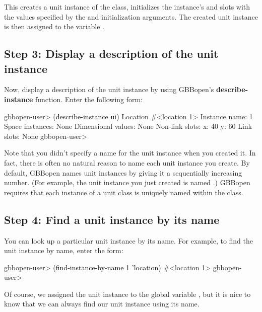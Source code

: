 \documentclass[10pt,twoside,english,pdftex]{article}
\begin{document}
This creates a unit instance of the  class, initializes the
instance's  and  slots with the values specified by the
 and  initialization arguments.  The created unit instance
is then assigned to the variable .

\subsection*{Step 3: Display a description of the unit instance}

%
%
Now, display a description of the unit instance by using GBBopen's
\textbf{describe-instance} function.  Enter the following form:
%
\W\supp
\begin{example}
\textcolor{darkergray}{%
  gbbopen-user> \textcolor{black}{(describe-instance ui)}
  Location #<location 1>
    Instance name: 1
    Space instances: None
    Dimensional values: None
    Non-link slots:
      x:  40
      y:  60
    Link slots: None
  gbbopen-user>}
\end{example}

Note that you didn't specify a name for the unit instance when you created it.
In fact, there is often no natural reason to name each unit instance you
create. By default, GBBopen names unit instances by giving it a sequentially
increasing number.  (For example, the unit instance you just created is named
.)  GBBopen requires that each instance of a unit class is uniquely
named within the class.

\subsection*{Step 4: Find a unit instance by its name}

%
%
You can look up a particular unit instance by its name. For example, to
find the   unit instance by name, enter the form:
%
\W\supp
\begin{example}
\textcolor{darkergray}{%
  gbbopen-user> \textcolor{black}{(find-instance-by-name 1 'location)}
  #<location 1>
  gbbopen-user>}
\end{example}

Of course, we assigned the  unit instance to the global
variable , but it is nice to know that we can always find our unit
instance using its name.
\end{document}
